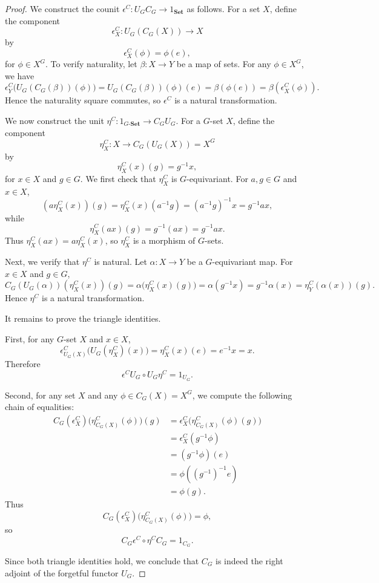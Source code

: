 \documentclass[10pt,a4paper]{amsart}
\begin{document}
\begin{proof}
We construct the counit $\epsilon^C \colon U_G C_G \longrightarrow 1_{\mathbf{Set}}$ as follows. 
For a set $X$, define the component 
\[
\epsilon^C_X \colon U_G(C_G(X)) \longrightarrow X
\]
by 
\[
\epsilon^C_X(\phi) = \phi(e),
\]
for $\phi \in X^G$. 
To verify naturality, let $\beta \colon X \rightarrow Y$ be a map of sets. For any $\phi \in X^G$, we have
\[
\epsilon^C_Y\bigl(U_G(C_G(\beta))(\phi)\bigr) 
= U_G(C_G(\beta))(\phi)(e) 
= \beta(\phi(e)) 
= \beta(\epsilon^C_X(\phi)).
\]
Hence the naturality square commutes, so $\epsilon^C$ is a natural transformation.

We now construct the unit $\eta^C \colon 1_{G\text{-}\mathbf{Set}} \longrightarrow C_G U_G$. 
For a $G$-set $X$, define the component 
\[
\eta^C_X \colon X \longrightarrow C_G(U_G(X)) = X^G
\]
by 
\[
\eta^C_X(x)(g) = g^{-1}x,
\]
for $x \in X$ and $g \in G$. 
We first check that $\eta^C_X$ is $G$-equivariant. For $a, g \in G$ and $x \in X$,
\[
(a \eta^C_X(x))(g) = \eta^C_X(x)(a^{-1}g) = (a^{-1}g)^{-1}x = g^{-1}ax,
\]
while
\[
\eta^C_X(ax)(g) = g^{-1}(ax) = g^{-1}ax.
\]
Thus $\eta^C_X(ax) = a \eta^C_X(x)$, so $\eta^C_X$ is a morphism of $G$-sets.

Next, we verify that $\eta^C$ is natural. Let $\alpha \colon X \rightarrow Y$ be a $G$-equivariant map. 
For $x \in X$ and $g \in G$,
\[
C_G(U_G(\alpha))(\eta^C_X(x))(g) 
= \alpha\bigl(\eta^C_X(x)(g)\bigr) 
= \alpha(g^{-1}x) 
= g^{-1}\alpha(x) 
= \eta^C_Y(\alpha(x))(g).
\]
Hence $\eta^C$ is a natural transformation.

It remains to prove the triangle identities.

First, for any $G$-set $X$ and $x \in X$,
\[
\epsilon^C_{U_G(X)}\bigl(U_G(\eta^C_X)(x)\bigr) 
= \eta^C_X(x)(e) 
= e^{-1}x 
= x.
\]
Therefore 
\[
\epsilon^C U_G \circ U_G \eta^C = 1_{U_G}.
\]

Second, for any set $X$ and any $\phi \in C_G(X) = X^G$, we compute the following chain of equalities:
\[
\begin{aligned}
C_G(\epsilon^C_X)\bigl(\eta^C_{C_G(X)}(\phi)\bigr)(g)
  &= \epsilon^C_X\bigl(\eta^C_{C_G(X)}(\phi)(g)\bigr) \\
  &= \epsilon^C_X(g^{-1}\phi) \\
  &= (g^{-1}\phi)(e) \\
  &= \phi((g^{-1})^{-1}e) \\
  &= \phi(g).
\end{aligned}
\]
Thus
\[
C_G(\epsilon^C_X)\bigl(\eta^C_{C_G(X)}(\phi)\bigr) = \phi,
\]
so
\[
C_G \epsilon^C \circ \eta^C C_G = 1_{C_G}.
\]

Since both triangle identities hold, we conclude that $C_G$ is indeed the right adjoint of the forgetful functor $U_G$.
\end{proof}
\end{document}
